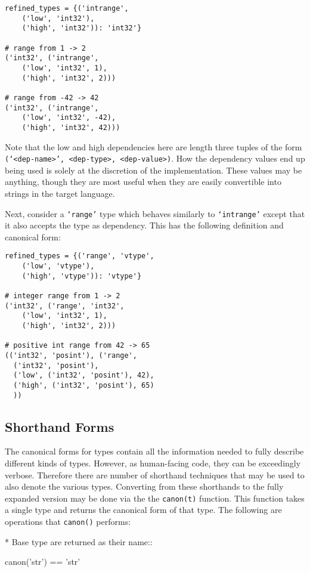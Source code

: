 \documentclass{ansconfpaper}
\newcommand{\vin}[1]{\texttt{{#1}}}
\begin{document}
\begin{lstlisting}
refined_types = {('intrange', 
    ('low', 'int32'), 
    ('high', 'int32')): 'int32'}

# range from 1 -> 2
('int32', ('intrange', 
    ('low', 'int32', 1), 
    ('high', 'int32', 2)))

# range from -42 -> 42
('int32', ('intrange', 
    ('low', 'int32', -42), 
    ('high', 'int32', 42)))
\end{lstlisting}
Note that the low and high dependencies here are length three tuples of the form
\vin{(`<dep-name>', <dep-type>, <dep-value>)}.  How the dependency values end up 
being used is solely at the discretion of the implementation.  These values may
be anything, though they are most useful when they are easily convertible into 
strings in the target language.

Next, consider a \vin{`range'} type which behaves similarly to \vin{`intrange'} 
except that it also accepts the type as dependency.  This has the following 
definition and canonical form:
\begin{lstlisting}
refined_types = {('range', 'vtype', 
    ('low', 'vtype'), 
    ('high', 'vtype')): 'vtype'}
    
# integer range from 1 -> 2
('int32', ('range', 'int32', 
    ('low', 'int32', 1), 
    ('high', 'int32', 2)))    

# positive int range from 42 -> 65
(('int32', 'posint'), ('range', 
  ('int32', 'posint'),
  ('low', ('int32', 'posint'), 42),
  ('high', ('int32', 'posint'), 65)
  ))
\end{lstlisting}

\subsection{Shorthand Forms}
\label{sec:shorhand}

The canonical forms for types contain all the information needed to fully describe
different kinds of types.  However, as human-facing code, they can be exceedingly 
verbose.  Therefore there are number of shorthand techniques that may be used to 
also denote the various types.  Converting from these shorthands to the fully
expanded version may be done via the the \vin{canon(t)} function.  This function
takes a single type and returns the canonical form of that type.  The following
are operations that \vin{canon()}  performs:

* Base type are returned as their name::

    canon('str') == 'str'
\end{document}
